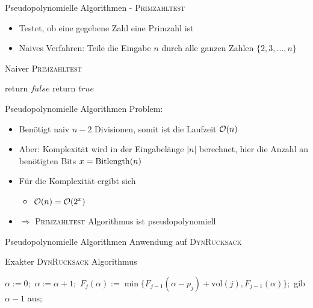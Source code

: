 \begin{frame}{Pseudopolynomielle Algorithmen - \textsc{Primzahltest}}
	\begin{itemize}
		\item Testet, ob eine gegebene Zahl eine Primzahl ist
		\item Naives Verfahren: Teile die Eingabe $n$ durch alle ganzen Zahlen $\{2,3,...,n\}$
	\end{itemize}
	
	\begin{algorithm}[H]
		\caption{Naiver \textsc{Primzahltest}}
		\begin{algorithmic}
			\State return $false$
			\EndIf
			\EndFor
			\State return $true$
			\EndFunction
		\end{algorithmic}
	\end{algorithm}
\end{frame}

\begin{frame}{Pseudopolynomielle Algorithmen}
	Problem:
	
	\begin{itemize}
		\item Benötigt naiv $n-2$ Divisionen, somit ist die Laufzeit $\mathcal{O}(n)$ 
		\item Aber: Komplexität wird in der Eingabelänge $|n|$ berechnet, hier die Anzahl an benötigten Bits $x = \operatorname{Bitlength}(n)$ 
		\item Für die Komplexität ergibt sich
		\begin{itemize}
			\item $\displaystyle \mathcal{O}(n) = \mathcal{O}(2^x)$
		\end{itemize}
		\item $\Rightarrow$ \textsc{Primzahltest} Algorithmus ist pseudopolynomiell
	\end{itemize}
\end{frame}

\begin{frame}{Pseudopolynomielle Algorithmen}
Anwendung auf \textsc{DynRucksack}
\newline

\begin{algorithm}[H]
    \caption{Exakter \textsc{DynRucksack} Algorithmus}
        \begin{algorithmic}
            \State $\alpha:=0;$
            \Repeat
            \State $\alpha:=\alpha+1;$
            \State $F_j(\alpha):=\min\{F_{j-1}(\alpha-p_j)+\text{vol}(j),F_{j-1}(\alpha)\};$
            \EndFor
            \State gib $\alpha-1$ aus$;$
        \end{algorithmic}
\end{algorithm}

\end{frame}

